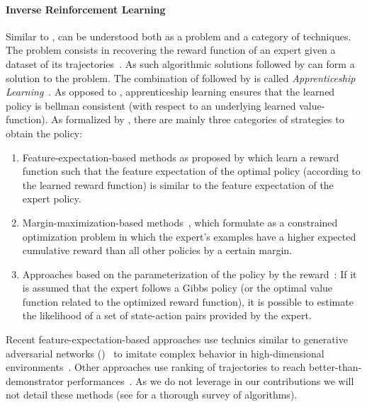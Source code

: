 \paragraph{Inverse Reinforcement Learning}

Similar to \rl, \irl can be understood both as a problem and a category of techniques. The \irl problem consists in recovering the reward function of an expert given a dataset of its trajectories~\citep{ng2000irl}. As such \irl algorithmic solutions followed by \rl can form a solution to the \il problem. The combination of \irl followed by \rl is called \textit{Apprenticeship Learning}~\citep{abbeel2004apprenticeship}. As opposed to \bc, apprenticeship learning ensures that the learned policy is bellman consistent (with respect to an underlying learned value-function). As formalized by \citet{klein2011apprenticeship}, there are mainly three categories of strategies to obtain the policy:
\begin{enumerate}[nosep]
\item Feature-expectation-based methods as proposed by \citet{ziebart2008maxentirl} which learn a reward function such that the feature expectation of the optimal policy (according to the learned reward function) is similar to the feature expectation of the expert policy. 
\item Margin-maximization-based methods~\citep{ratlif2006maxmargin}, which formulate \irl as a constrained optimization problem in which the expert's examples have a higher expected cumulative reward than all other policies by a certain margin.
\item Approaches based on the parameterization of the policy by the reward~\citep{neu2007apprenticeship}: If it is assumed that the expert follows a Gibbs policy (or the optimal value function related to the optimized reward function), it is possible to estimate the likelihood of a set of state-action pairs provided by the expert.
\end{enumerate}
%
Recent feature-expectation-based approaches use technics similar to generative adversarial networks (\gan)~\citep{goodfellow2014generative} to imitate complex behavior in high-dimensional environments~\citep{ho2016gail}. Other approaches use ranking of trajectories to reach better-than-demonstrator performances~\citep{brown2020better}. As we do not leverage \irl in our contributions we will not detail these methods (see \citet{arora_survey_2021} for a thorough survey of \irl algorithms).


